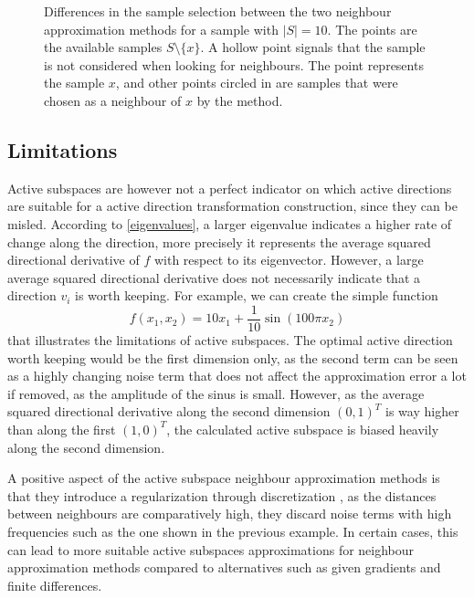 \documentclass[
  a4paper,  %
  twoside,  %
  bibliography=totoc,
  headsepline,
  cleardoublepage=empty,
  parskip=half,
  draft=false
]{scrbook}
\begin{document}
\begin{mdframed}[style=style]
\begin{figure}[H]
\begin{subfigure}{.45\textwidth}
  \vspace{2mm}
  \label{fig:as_nn}
\end{subfigure}
\delimit
\caption{Differences in the sample selection between the two neighbour approximation methods for a sample with $|S|=10$.
The \darkblue points are the available samples $S \setminus \{x\}$.
A hollow point signals that the sample is not considered when looking for neighbours.
The \red point represents the sample $x$, and other points circled in \red are samples that were chosen as a neighbour of $x$ by the method.}
\label{fig:as_approx}
\end{figure}
\end{mdframed}

\subsection{Limitations}
\label{sec:asl}

Active subspaces are however not a perfect indicator on which active directions are suitable for a active direction transformation construction, since they can be misled.
According to \cref{eigenvalues}, a larger eigenvalue indicates a higher rate of change along the direction, more precisely it represents the average squared directional derivative of $f$ with respect to its eigenvector.
However, a large average squared directional derivative does not necessarily indicate that a direction $v_i$ is worth keeping.
For example, we can create the simple function
\begin{equation}
f(x_1, x_2)=10x_1 + \frac{1}{10} \sin(100 \pi x_2)
\end{equation}
that illustrates the limitations of active subspaces.
The optimal active direction worth keeping would be the first dimension only, as the second term can be seen as a highly changing noise term that does not affect the approximation error a lot if removed, as the amplitude of the sinus is small.
However, as the average squared directional derivative along the second dimension $(0,1)^T$ is way higher than along the first $(1,0)^T$, the calculated active subspace is biased heavily along the second dimension.

A positive aspect of the active subspace neighbour approximation methods is that they introduce a regularization through discretization \cite{Kress1999}, \ie as the distances between neighbours are comparatively high, they discard noise terms with high frequencies such as the one shown in the previous example.
In certain cases, this can lead to more suitable active subspaces approximations for neighbour approximation methods compared to alternatives such as given gradients and finite differences.
\end{document}
